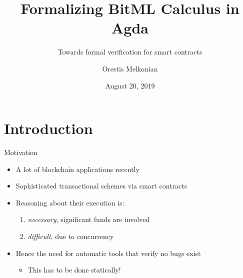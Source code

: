 \documentclass[aspectratio=43]{beamer}
\title{Formalizing BitML Calculus in Agda}
\subtitle{Towards formal verification for smart contracts}
\author{Orestis Melkonian}
\date{August 20, 2019}
\renewcommand\alert[1]{\textcolor{mLightBrown}{#1}}
\begin{document}
\begin{center}
\maketitle
{}
\end{center}

\section{Introduction}

\begin{frame}{Motivation}
\begin{itemize}
\item A lot of blockchain applications recently
\item Sophisticated transactional schemes via \alert{smart contracts}
\item Reasoning about their execution is:
  \begin{enumerate}
  \item \textit{necessary}, significant funds are involved
  \item \textit{difficult}, due to concurrency
  \end{enumerate}
\item Hence the need for automatic tools that verify no bugs exist
  \begin{itemize}
  \item This has to be done \alert{statically}!
  \end{itemize}
\end{itemize}
\end{frame}
\end{document}
